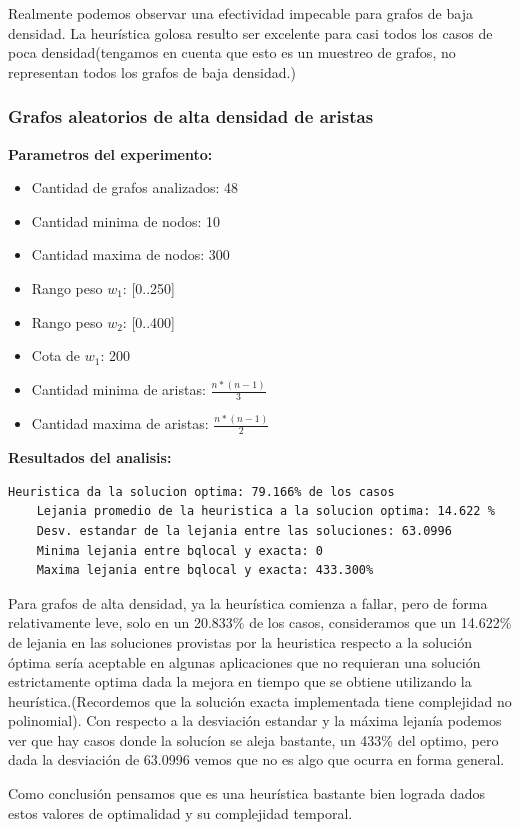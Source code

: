 Realmente podemos observar una efectividad impecable para grafos de baja densidad. La heur\'istica golosa resulto ser excelente para casi todos los casos de poca densidad(tengamos en cuenta que esto es un muestreo de grafos, no representan todos los grafos de baja densidad.)

\subsubsection{Grafos aleatorios de alta densidad de aristas}
\textbf{Parametros del experimento:}
\begin{itemize}
	\item Cantidad de grafos analizados: 48
	\item Cantidad minima de nodos: 10
	\item Cantidad maxima de nodos: 300
	\item Rango peso $w_1$: [0..250]
	\item Rango peso $w_2$: [0..400]
	\item Cota de $w_1$: 200
	\item Cantidad minima de aristas: $\frac{n * (n-1)}{3}$
	\item Cantidad maxima de aristas: $\frac{n * (n-1)}{2}$
\end{itemize}

\textbf{Resultados del analisis:}
\begin{lstlisting}[frame=single]
	Heuristica da la solucion optima: 79.166% de los casos
	Lejania promedio de la heuristica a la solucion optima: 14.622 %
	Desv. estandar de la lejania entre las soluciones: 63.0996
	Minima lejania entre bqlocal y exacta: 0
	Maxima lejania entre bqlocal y exacta: 433.300%
\end{lstlisting}

Para grafos de alta densidad, ya la heur\'istica comienza a fallar, pero de forma relativamente leve, solo en un 20.833\% de los casos, consideramos que un 14.622\% de lejania en las soluciones provistas por la heuristica respecto a la soluci\'on \'optima ser\'ia aceptable en algunas aplicaciones que no requieran una soluci\'on estrictamente optima dada la mejora en tiempo que se obtiene utilizando la heur\'istica.(Recordemos que la soluci\'on exacta implementada tiene complejidad no polinomial). Con respecto a la desviaci\'on estandar y la m\'axima lejan\'ia podemos ver que hay casos donde la soluc\'ion se aleja bastante, un 433\% del optimo, pero dada la desviaci\'on de 63.0996 vemos que no es algo que ocurra en forma general.

Como conclusi\'on pensamos que es una heur\'istica bastante bien lograda dados estos valores de optimalidad y su complejidad temporal.